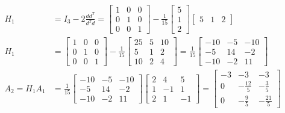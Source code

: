 \documentclass{exam}
\begin{document}
\begin{align*}
	H_1           & = I_3 - 2 \frac{d d^T}{d^T d} = \begin{bmatrix} 1 & 0 & 0 \\ 0 & 1 & 0 \\ 0 & 0 & 1 \end{bmatrix} - \frac{1}{15} \begin{bmatrix} 5 \\ 1 \\ 2 \end{bmatrix} \begin{bmatrix} 5 & 1 & 2 \end{bmatrix}                                                                                    \\
	H_1           & = \begin{bmatrix} 1 & 0 & 0 \\ 0 & 1 & 0 \\ 0 & 0 & 1 \end{bmatrix} - \frac{1}{15} \begin{bmatrix} 25 & 5 & 10 \\ 5 & 1 & 2 \\ 10 & 2 & 4 \end{bmatrix} = \frac{1}{15} \begin{bmatrix} -10 & -5 & -10 \\ -5 & 14 & -2 \\ -10 & -2 & 11 \end{bmatrix}                                  \\
	A_2 = H_1 A_1 & = \frac{1}{15} \begin{bmatrix} -10 & -5 & -10 \\ -5 & 14 & -2 \\ -10 & -2 & 11 \end{bmatrix} \begin{bmatrix} 2 & 4 & 5 \\ 1 & -1 & 1 \\ 2 & 1 & -1 \end{bmatrix} = \begin{bmatrix} -3 & -3 & -3 \\ 0 & -\frac{12}{5} & -\frac{3}{5} \\ 0 & -\frac{9}{5} & -\frac{21}{5} \end{bmatrix}
\end{align*}
\end{document}
